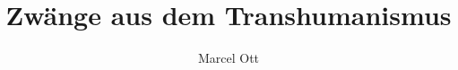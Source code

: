 \documentclass{article}
\begin{document}
\title{Zwänge aus dem Transhumanismus}
\author{Marcel Ott}
\maketitle

\newpage

\tableofcontents

\newpage


\newpage


\end{document}
